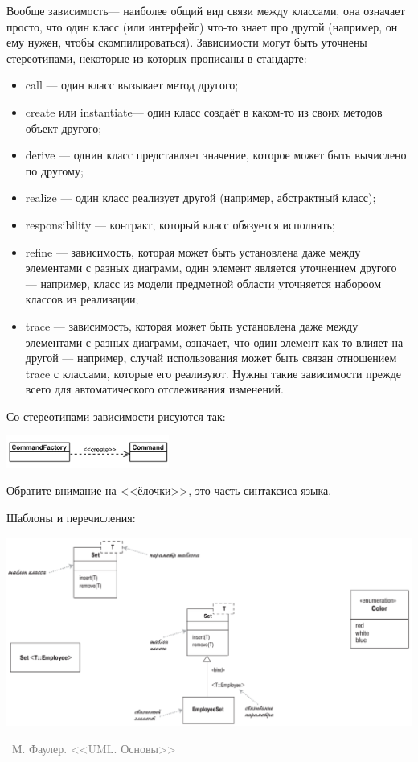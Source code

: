 \documentclass[a5paper]{article}
\newcommand{\attribution}[1] {
    \vspace{-5mm}\begin{flushright}\begin{scriptsize}\textcolor{gray}{\textcopyright\, #1}\end{scriptsize}\end{flushright}
}
\begin{document}
Вообще зависимость--- наиболее общий вид связи между классами, она означает просто, что один класс (или интерфейс) что-то знает про другой (например, он ему нужен, чтобы скомпилироваться). Зависимости могут быть уточнены стереотипами, некоторые из которых прописаны в стандарте:

\begin{itemize}
    \item call --- один класс вызывает метод другого;
    \item create или instantiate--- один класс создаёт в каком-то из своих методов объект другого;
    \item derive --- однин класс представляет значение, которое может быть вычислено по другому;
    \item realize --- один класс реализует другой (например, абстрактный класс);
    \item responsibility --- контракт, который класс обязуется исполнять;
    \item refine --- зависимость, которая может быть установлена даже между элементами с разных диаграмм, один элемент является уточнением другого --- например, класс из модели предметной области уточняется набороом классов из реализации;
    \item trace --- зависимость, которая может быть установлена даже между элементами с разных диаграмм, означает, что один элемент как-то влияет на другой --- например, случай использования может быть связан отношением trace с классами, которые его реализуют. Нужны такие зависимости прежде всего для автоматического отслеживания изменений.
\end{itemize}

Со стереотипами зависимости рисуются так:

\begin{center}
    \includegraphics[width=0.4\textwidth]{createDependency.png}
\end{center}

Обратите внимание на <<ёлочки>>, это часть синтаксиса языка.

Шаблоны и перечисления:

\begin{center}
    \includegraphics[width=\textwidth]{genericsAndEnums.png}
    \attribution{М. Фаулер. <<UML. Основы>>}
\end{center}
\end{document}
